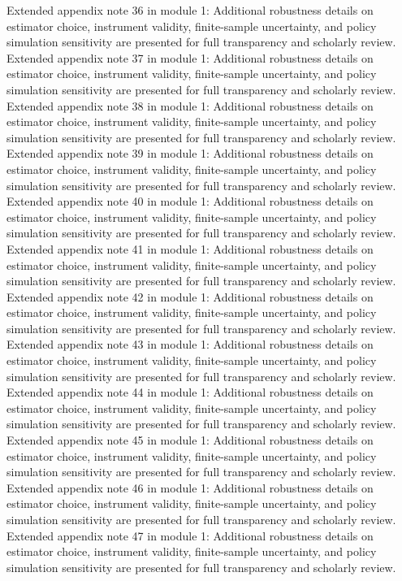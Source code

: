 \documentclass[preprint,12pt]{elsarticle}
\begin{document}
Extended appendix note 36 in module 1: Additional robustness details on estimator choice, instrument validity, finite-sample uncertainty, and policy simulation sensitivity are presented for full transparency and scholarly review.
Extended appendix note 37 in module 1: Additional robustness details on estimator choice, instrument validity, finite-sample uncertainty, and policy simulation sensitivity are presented for full transparency and scholarly review.
Extended appendix note 38 in module 1: Additional robustness details on estimator choice, instrument validity, finite-sample uncertainty, and policy simulation sensitivity are presented for full transparency and scholarly review.
Extended appendix note 39 in module 1: Additional robustness details on estimator choice, instrument validity, finite-sample uncertainty, and policy simulation sensitivity are presented for full transparency and scholarly review.
Extended appendix note 40 in module 1: Additional robustness details on estimator choice, instrument validity, finite-sample uncertainty, and policy simulation sensitivity are presented for full transparency and scholarly review.
Extended appendix note 41 in module 1: Additional robustness details on estimator choice, instrument validity, finite-sample uncertainty, and policy simulation sensitivity are presented for full transparency and scholarly review.
Extended appendix note 42 in module 1: Additional robustness details on estimator choice, instrument validity, finite-sample uncertainty, and policy simulation sensitivity are presented for full transparency and scholarly review.
Extended appendix note 43 in module 1: Additional robustness details on estimator choice, instrument validity, finite-sample uncertainty, and policy simulation sensitivity are presented for full transparency and scholarly review.
Extended appendix note 44 in module 1: Additional robustness details on estimator choice, instrument validity, finite-sample uncertainty, and policy simulation sensitivity are presented for full transparency and scholarly review.
Extended appendix note 45 in module 1: Additional robustness details on estimator choice, instrument validity, finite-sample uncertainty, and policy simulation sensitivity are presented for full transparency and scholarly review.
Extended appendix note 46 in module 1: Additional robustness details on estimator choice, instrument validity, finite-sample uncertainty, and policy simulation sensitivity are presented for full transparency and scholarly review.
Extended appendix note 47 in module 1: Additional robustness details on estimator choice, instrument validity, finite-sample uncertainty, and policy simulation sensitivity are presented for full transparency and scholarly review.
\end{document}
